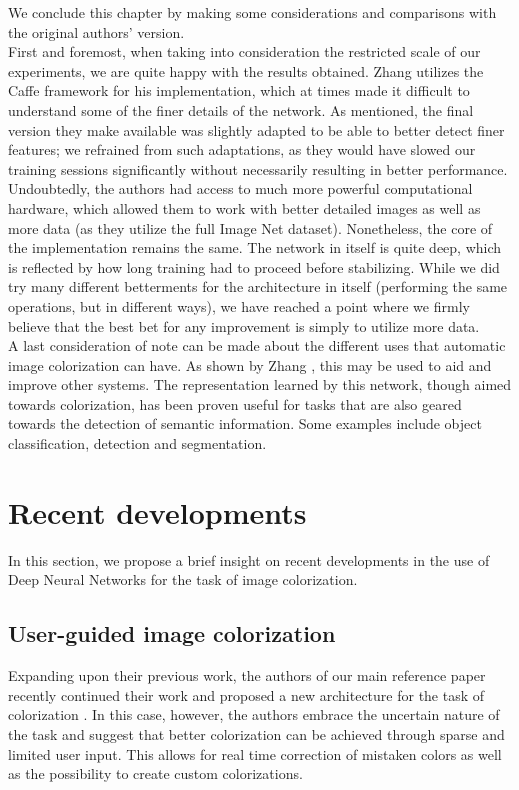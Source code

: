 \documentclass[twoside,twocolumn]{article}
\begin{document}
We conclude this chapter by making some considerations and comparisons with the original authors’ version. \\
First and foremost, when taking into consideration the restricted scale of our experiments, we are quite happy with the results obtained. Zhang \cite{Zhang:2016} utilizes the Caffe framework for his implementation, which at times made it difficult to understand some of the finer details of the network. As mentioned, the final version they make available \cite{Zhang:github} was slightly adapted to be able to better detect finer features; we refrained from such adaptations, as they would have slowed our training sessions significantly without necessarily resulting in better performance. \\
Undoubtedly, the authors had access to much more powerful computational hardware, which allowed them to work with better detailed images as well as more data (as they utilize the full Image Net dataset). Nonetheless, the core of the implementation remains the same. The network in itself is quite deep, which is reflected by how long training had to proceed before stabilizing. While we did try many different betterments for the architecture in itself (performing the same operations, but in different ways), we have reached a point where we firmly believe that the best bet for any improvement is simply to utilize more data.\\
A last consideration of note can be made about the different uses that automatic image colorization can have. As shown by Zhang \cite{Zhang:2016}, this may be used to aid and improve other systems. The representation learned by this network, though aimed towards colorization, has been proven useful for tasks that are also geared towards the detection of semantic information. Some examples include object classification, detection and segmentation.



\newpage

\section{Recent developments}

In this section, we propose a brief insight on recent developments in the use of Deep Neural Networks for the task of image colorization. 

\subsection{User-guided image colorization}
Expanding upon their previous work, the authors of our main reference paper recently continued their work and proposed a new architecture for the task of colorization \cite{Zhang:2017}. In this case, however, the authors embrace the uncertain nature of the task and suggest that better colorization can be achieved through sparse and limited user input. This allows for real time correction of mistaken colors as well as the possibility to create custom colorizations.
\end{document}
